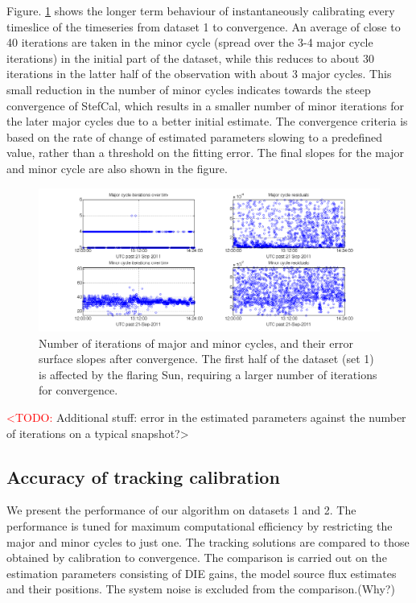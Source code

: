 \documentclass{aa}
\begin{document}
Figure. \ref{fig:Major-and-minor} shows the longer term behaviour
of instantaneously calibrating every timeslice of the timeseries from
dataset 1 to convergence. An average of close to 40 iterations are
taken in the minor cycle (spread over the 3-4 major cycle iterations)
in the initial part of the dataset, while this reduces to about 30
iterations in the latter half of the observation with about 3 major
cycles. This small reduction in the number of minor cycles indicates
towards the steep convergence of StefCal, which results in a smaller
number of minor iterations for the later major cycles due to a better
initial estimate. The convergence criteria is based on the rate of
change of estimated parameters slowing to a predefined value, rather
than a threshold on the fitting error. The final slopes for the major
and minor cycle are also shown in the figure. 

\begin{figure}[tbh]
\includegraphics[width=0.9\paperwidth]{Figs/SB000_iter_resid_lsimg_wo_short_blines}

\caption{\label{fig:Major-and-minor}Number of iterations of major and minor
cycles, and their error surface slopes after convergence. The first
half of the dataset (set 1) is affected by the flaring Sun, requiring
a larger number of iterations for convergence.}
\end{figure}


\textcolor{red}{<TODO:} Additional stuff: error in the estimated parameters
against the number of iterations on a typical snapshot?>


\subsection{Accuracy of tracking calibration}

We present the performance of our algorithm on datasets 1 and 2. The
performance is tuned for maximum computational efficiency by restricting
the major and minor cycles to just one. The tracking solutions are
compared to those obtained by calibration to convergence. The comparison
is carried out on the estimation parameters consisting of DIE gains,
the model source flux estimates and their positions. The system noise
is excluded from the comparison.(Why?)
\end{document}
